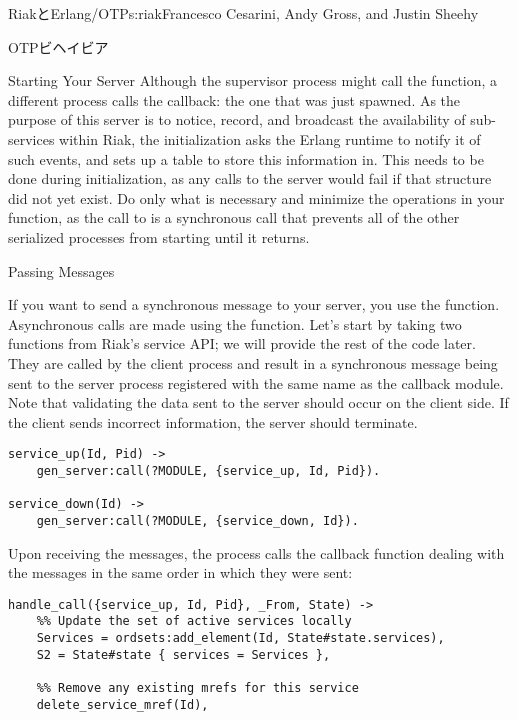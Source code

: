 \begin{aosachapter}{RiakとErlang/OTP}{s:riak}{Francesco Cesarini, Andy Gross, and Justin Sheehy}
\begin{aosasect1}{OTPビヘイビア}
\begin{aosasect2}{Starting Your Server}
Although the supervisor process might call the 
function, a different process calls the  callback: the
one that was just spawned.  As the purpose of this server is to
notice, record, and broadcast the availability of sub-services within
Riak, the initialization asks the Erlang runtime to notify it of such
events, and sets up a table to store this information in.  This needs
to be done during initialization, as any calls to the server would
fail if that structure did not yet exist. Do only what is necessary
and minimize the operations in your  function, as the call
to  is a synchronous call that prevents all of the other
serialized processes from starting until it returns.

\end{aosasect2}

\begin{aosasect2}{Passing Messages}

If you want to send a synchronous message to your server, you use the
 function. Asynchronous calls are made using
the  function. Let's start by taking two
functions from Riak's service API; we will provide the rest of the
code later. They are called by the client process and result in a
synchronous message being sent to the server process registered with
the same name as the callback module. Note that validating the data
sent to the server should occur on the client side. If the client
sends incorrect information, the server should terminate.

\begin{verbatim}
service_up(Id, Pid) ->
    gen_server:call(?MODULE, {service_up, Id, Pid}).

service_down(Id) ->
    gen_server:call(?MODULE, {service_down, Id}).
\end{verbatim}

\noindent Upon receiving the messages, the  process calls the
 callback function dealing with the messages in
the same order in which they were sent:

\begin{verbatim}
handle_call({service_up, Id, Pid}, _From, State) ->
    %% Update the set of active services locally
    Services = ordsets:add_element(Id, State#state.services),
    S2 = State#state { services = Services },

    %% Remove any existing mrefs for this service
    delete_service_mref(Id),


\end{verbatim}
\end{aosasect2}
\end{aosasect1}
\end{aosachapter}
